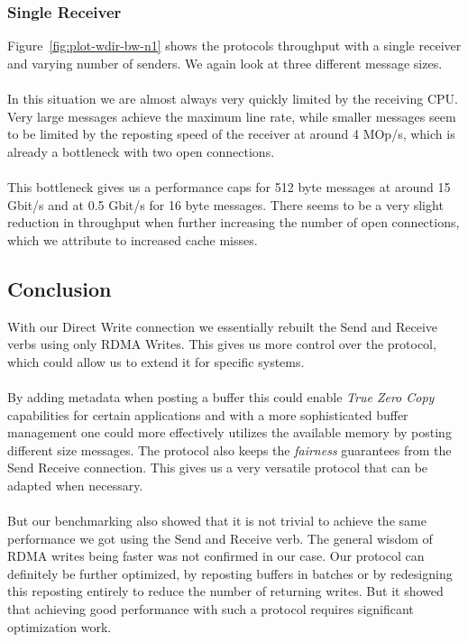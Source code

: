 \subsubsection{Single Receiver}

Figure~\ref{fig:plot-wdir-bw-n1} shows the protocols throughput with a single receiver and varying number of senders.
We again look at three different message sizes. 

\paragraph{} In this situation we are almost always very quickly limited by the receiving CPU. Very large messages achieve the maximum 
line rate,  while smaller messages seem to be limited by the reposting speed of the receiver at around 4 MOp/s, which is 
already a bottleneck with two open connections.

\paragraph{} This bottleneck gives us a performance caps for 512 byte messages at around 15 Gbit/s and at 0.5 Gbit/s for 16 byte messages.
There seems to be a very slight reduction in throughput when further increasing the number of open connections, which we 
attribute to increased cache misses.

\subsection{Conclusion}

With our Direct Write connection we essentially rebuilt the Send and Receive verbs using only RDMA Writes. This gives us more
control over the protocol, which could allow us to extend it for specific systems.

\paragraph{} By adding metadata when posting a buffer this could enable \emph{True Zero Copy} capabilities for certain 
applications and with a more sophisticated buffer management one could more effectively utilizes the available memory by 
posting different size messages. The protocol also keeps the \emph{fairness} guarantees from the Send Receive connection. 
This gives us a very versatile protocol that can be adapted when necessary.

\paragraph{} But our benchmarking also showed that it is not trivial to achieve the same performance we got using the Send
and Receive verb. The general wisdom of RDMA writes being faster was not confirmed in our case. Our protocol can 
definitely be further optimized, by reposting buffers in batches or by redesigning this reposting entirely to reduce
the number of returning writes. But it showed that achieving good performance with such a protocol requires significant 
optimization work.







